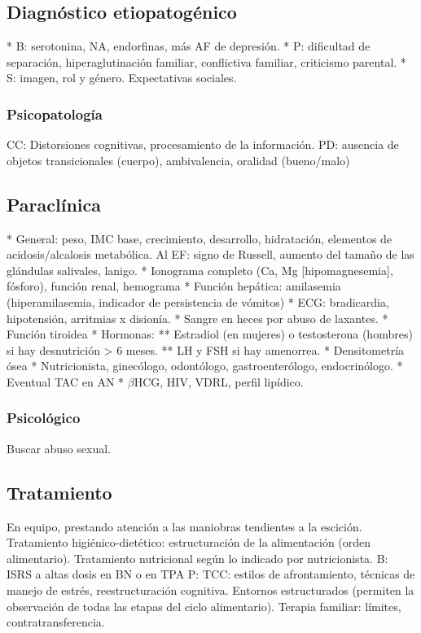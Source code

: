 \subsection*{Diagnóstico etiopatogénico}
* B: serotonina, NA, endorfinas, más AF de depresión.
* P: dificultad de separación, hiperaglutinación familiar, conflictiva familiar, criticismo parental.
* S: imagen, rol y género. Expectativas sociales.

\subsubsection*{Psicopatología}
CC: Distorsiones cognitivas, procesamiento de la información.
PD: ausencia de objetos transicionales (cuerpo), ambivalencia, oralidad (bueno/malo)

\subsection*{Paraclínica}
* General: peso, IMC base, crecimiento, desarrollo, hidratación, elementos de acidosis/alcalosis metabólica. Al EF: signo de Russell, aumento del tamaño de las glándulas salivales, lanigo.
* Ionograma completo (Ca, Mg [hipomagnesemia], fósforo), función renal, hemograma
* Función hepática: amilasemia (hiperamilasemia, indicador de persistencia de vómitos)
* ECG: bradicardia, hipotensión, arritmias x disionía.
* Sangre en heces por abuso de laxantes.
* Función tiroidea
* Hormonas:
** Estradiol (en mujeres) o testosterona (hombres) si hay desnutrición > 6 meses.
** LH y FSH si hay amenorrea.
* Densitometría ósea
* Nutricionista, ginecólogo, odontólogo, gastroenterólogo, endocrinólogo.
* Eventual TAC en AN
* $\beta$HCG, HIV, VDRL, perfil lipídico.

\subsubsection*{Psicológico}
Buscar abuso sexual.

\subsection*{Tratamiento}
En equipo, prestando atención a las maniobras tendientes a la escición.
Tratamiento higiénico-dietético: estructuración de la alimentación (orden alimentario).
Tratamiento nutricional según lo indicado por nutricionista.
B: ISRS a altas dosis en BN o en TPA
P: TCC: estilos de afrontamiento, técnicas de manejo de estrés, reestructuración cognitiva. Entornos estructurados (permiten la observación de todas las etapas del ciclo alimentario). Terapia familiar: límites, contratransferencia.

